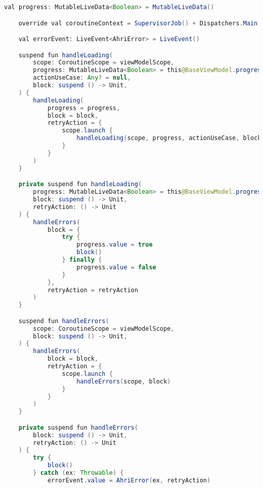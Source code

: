 \begin{asection}
\begin{lstlisting}[language=Java,label={lst:add:a_3}, caption={BaseViewModel}]
    val progress: MutableLiveData<Boolean> = MutableLiveData()

    override val coroutineContext = SupervisorJob() + Dispatchers.Main

    val errorEvent: LiveEvent<AhriError> = LiveEvent()

    suspend fun handleLoading(
        scope: CoroutineScope = viewModelScope,
        progress: MutableLiveData<Boolean> = this@BaseViewModel.progress,
        actionUseCase: Any? = null,
        block: suspend () -> Unit,
    ) {
        handleLoading(
            progress = progress,
            block = block,
            retryAction = {
                scope.launch {
                    handleLoading(scope, progress, actionUseCase, block)
                }
            }
        )
    }

    private suspend fun handleLoading(
        progress: MutableLiveData<Boolean> = this@BaseViewModel.progress,
        block: suspend () -> Unit,
        retryAction: () -> Unit
    ) {
        handleErrors(
            block = {
                try {
                    progress.value = true
                    block()
                } finally {
                    progress.value = false
                }
            },
            retryAction = retryAction
        )
    }

    suspend fun handleErrors(
        scope: CoroutineScope = viewModelScope,
        block: suspend () -> Unit,
    ) {
        handleErrors(
            block = block,
            retryAction = {
                scope.launch {
                    handleErrors(scope, block)
                }
            }
        )
    }

    private suspend fun handleErrors(
        block: suspend () -> Unit,
        retryAction: () -> Unit
    ) {
        try {
            block()
        } catch (ex: Throwable) {
            errorEvent.value = AhriError(ex, retryAction)


\end{lstlisting}
\end{asection}

